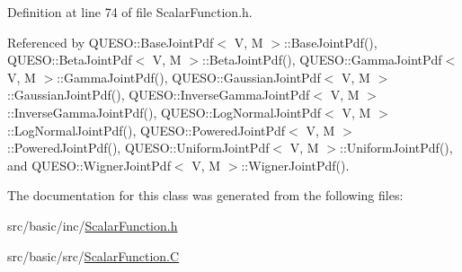 Definition at line 74 of file Scalar\-Function.\-h.



Referenced by Q\-U\-E\-S\-O\-::\-Base\-Joint\-Pdf$<$ V, M $>$\-::\-Base\-Joint\-Pdf(), Q\-U\-E\-S\-O\-::\-Beta\-Joint\-Pdf$<$ V, M $>$\-::\-Beta\-Joint\-Pdf(), Q\-U\-E\-S\-O\-::\-Gamma\-Joint\-Pdf$<$ V, M $>$\-::\-Gamma\-Joint\-Pdf(), Q\-U\-E\-S\-O\-::\-Gaussian\-Joint\-Pdf$<$ V, M $>$\-::\-Gaussian\-Joint\-Pdf(), Q\-U\-E\-S\-O\-::\-Inverse\-Gamma\-Joint\-Pdf$<$ V, M $>$\-::\-Inverse\-Gamma\-Joint\-Pdf(), Q\-U\-E\-S\-O\-::\-Log\-Normal\-Joint\-Pdf$<$ V, M $>$\-::\-Log\-Normal\-Joint\-Pdf(), Q\-U\-E\-S\-O\-::\-Powered\-Joint\-Pdf$<$ V, M $>$\-::\-Powered\-Joint\-Pdf(), Q\-U\-E\-S\-O\-::\-Uniform\-Joint\-Pdf$<$ V, M $>$\-::\-Uniform\-Joint\-Pdf(), and Q\-U\-E\-S\-O\-::\-Wigner\-Joint\-Pdf$<$ V, M $>$\-::\-Wigner\-Joint\-Pdf().



The documentation for this class was generated from the following files\-:\begin{DoxyCompactItemize}
\item 
src/basic/inc/\hyperlink{_scalar_function_8h}{Scalar\-Function.\-h}\item 
src/basic/src/\hyperlink{_scalar_function_8_c}{Scalar\-Function.\-C}\end{DoxyCompactItemize}
